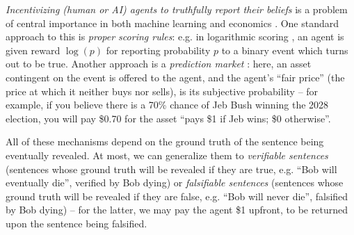 \emph{Incentivizing (human or AI) agents to truthfully report their beliefs} is a problem of central importance in both machine learning and economics \cite{savageElicitationPersonalProbabilities1971,gneitingStrictlyProperScoring2007}. One standard approach to this is \emph{proper scoring rules}: e.g. in logarithmic scoring \cite{goodRationalDecisions1952}, an agent is given reward $\log(p)$ for reporting probability $p$ to a binary event which turns out to be true. Another approach is a \emph{prediction market} \cite{hansonLogarithmicMarketScoring2002, hansonCombinatorialInformationMarket2003, beygelzimerLearningPerformancePrediction2012, conitzerPredictionMarketsMechanism2012}: here, an asset contingent on the event is offered to the agent, and the agent's ``fair price'' (the price at which it neither buys nor sells), is its subjective probability -- for example, if you believe there is a 70\% chance of Jeb Bush winning the 2028 election, you will pay \$0.70 for the asset ``pays \$1 if Jeb wins; \$0 otherwise''.

All of these mechanisms depend on the ground truth of the sentence being eventually revealed. At most, we can generalize them to \emph{verifiable sentences} (sentences whose ground truth will be revealed if they are true, e.g. ``Bob will eventually die'', verified by Bob dying) or \emph{falsifiable sentences} (sentences whose ground truth will be revealed if they are false, e.g. ``Bob will never die'', falsified by Bob dying) -- for the latter, we may pay the agent \$1 upfront, to be returned upon the sentence being falsified.

